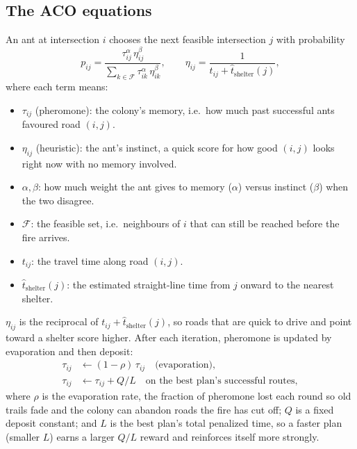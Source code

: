 \documentclass[11pt,a4paper]{article}
\begin{document}
\subsection{The ACO equations}
An ant at intersection $i$ chooses the next feasible intersection $j$ with probability
\begin{equation}
p_{ij} = \frac{\tau_{ij}^{\alpha}\,\eta_{ij}^{\beta}}{\sum_{k \in \mathcal{F}} \tau_{ik}^{\alpha}\,\eta_{ik}^{\beta}},
\qquad
\eta_{ij} = \frac{1}{t_{ij} + \hat{t}_{\text{shelter}}(j)},
\label{eq:trans}
\end{equation}
where each term means:
\begin{itemize}
\item $\tau_{ij}$ (pheromone): the colony's memory, i.e.\ how much past successful ants favoured road $(i,j)$.
\item $\eta_{ij}$ (heuristic): the ant's instinct, a quick score for how good $(i,j)$ looks right now with no memory involved.
\item $\alpha, \beta$: how much weight the ant gives to memory ($\alpha$) versus instinct ($\beta$) when the two disagree.
\item $\mathcal{F}$: the feasible set, i.e.\ neighbours of $i$ that can still be reached before the fire arrives.
\item $t_{ij}$: the travel time along road $(i,j)$.
\item $\hat{t}_{\text{shelter}}(j)$: the estimated straight-line time from $j$ onward to the nearest shelter.
\end{itemize}
$\eta_{ij}$ is the reciprocal of $t_{ij}+\hat{t}_{\text{shelter}}(j)$, so roads that are quick to drive and point toward a shelter score higher. After each iteration, pheromone is updated by evaporation and then deposit:
\begin{align}
\tau_{ij} &\leftarrow (1-\rho)\,\tau_{ij} \quad \text{(evaporation)}, \label{eq:evap}\\
\tau_{ij} &\leftarrow \tau_{ij} + Q / L \quad \text{on the best plan's successful routes}, \label{eq:dep}
\end{align}
where $\rho$ is the evaporation rate, the fraction of pheromone lost each round so old trails fade and the colony can abandon roads the fire has cut off; $Q$ is a fixed deposit constant; and $L$ is the best plan's total penalized time, so a faster plan (smaller $L$) earns a larger $Q/L$ reward and reinforces itself more strongly.

\end{document}
